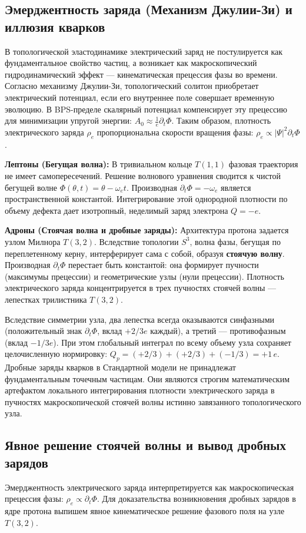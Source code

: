 \documentclass[12pt,a4paper]{article}
\begin{document}
	\subsection{Эмерджентность заряда (Механизм Джулии-Зи) и иллюзия кварков}
	
	В топологической эластодинамике электрический заряд не постулируется как фундаментальное свойство частиц, а возникает как макроскопический гидродинамический эффект — кинематическая прецессия фазы во времени. Согласно механизму Джулии-Зи, топологический солитон приобретает электрический потенциал, если его внутреннее поле совершает временную эволюцию. В BPS-пределе скалярный потенциал компенсирует эту прецессию для минимизации упругой энергии: $A_0 \approx \frac{1}{e} \partial_t \Phi$. 
	Таким образом, плотность электрического заряда $\rho_e$ пропорциональна скорости вращения фазы: $\rho_e \propto |\Psi|^2 \partial_t \Phi$.
	
	\textbf{Лептоны (Бегущая волна):} В тривиальном кольце $T(1,1)$ фазовая траектория не имеет самопересечений. Решение волнового уравнения сводится к чистой бегущей волне $\Phi(\theta, t) = \theta - \omega_e t$. Производная $\partial_t \Phi = -\omega_e$ является пространственной константой. Интегрирование этой однородной плотности по объему дефекта дает изотропный, неделимый заряд электрона $Q = -e$.
	
	\textbf{Адроны (Стоячая волна и дробные заряды):} Архитектура протона задается узлом Милнора $T(3,2)$. Вследствие топологии $S^3$, волна фазы, бегущая по переплетенному керну, интерферирует сама с собой, образуя \textbf{стоячую волну}. Производная $\partial_t \Phi$ перестает быть константой: она формирует пучности (максимумы прецессии) и геометрические узлы (нули прецессии). 
	Плотность электрического заряда концентрируется в трех пучностях стоячей волны — лепестках трилистника $T(3,2)$. 
	
	Вследствие симметрии узла, два лепестка всегда оказываются синфазными (положительный знак $\partial_t \Phi$, вклад $+2/3 e$ каждый), а третий — противофазным (вклад $-1/3 e$). При этом глобальный интеграл по всему объему узла сохраняет целочисленную нормировку: $Q_p = (+2/3) + (+2/3) + (-1/3) = +1\,e$.
	Дробные заряды кварков в Стандартной модели не принадлежат фундаментальным точечным частицам. Они являются строгим математическим артефактом локального интегрирования плотности электрического заряда в пучностях макроскопической стоячей волны истинно завязанного топологического узла.
	
	\subsection{Явное решение стоячей волны и вывод дробных зарядов}
	Эмерджентность электрического заряда интерпретируется как макроскопическая прецессия фазы: $\rho_e \propto \partial_t \Phi$. Для доказательства возникновения дробных зарядов в ядре протона выпишем явное кинематическое решение фазового поля на узле $T(3,2)$.
	
\end{document}
